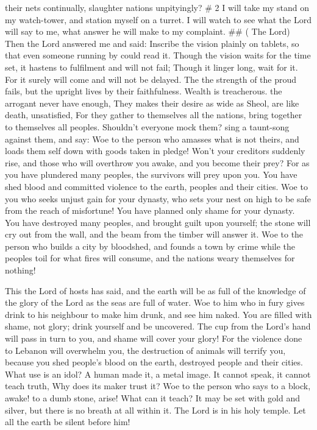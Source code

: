 their nets continually, slaughter nations unpityingly? \# 2 
I will take my stand on my watch-tower, and station myself on a turret.
I will watch to see what the Lord will say to me, what answer he will
make to my complaint. \#\# ( The Lord)  Then the Lord
answered me and said: Inscribe the vision plainly on tablets, so that
even someone running by could read it.  Though the vision
waits for the time set, it hastens to fulfilment and will not fail;
Though it linger long, wait for it. For it surely will come and will not
be delayed.  The the strength of the proud fails, but the
upright lives by their faithfulness.  Wealth is treacherous.
the arrogant never have enough, They makes their desire as wide as
Sheol, are like death, unsatisfied, For they gather to themselves all
the nations, bring together to themselves all peoples. 
Shouldn't everyone mock them? sing a taunt-song against them, and say:
Woe to the person who amasses what is not theirs, and loads them self
down with goods taken in pledge!  Won't your creditors
suddenly rise, and those who will overthrow you awake, and you become
their prey?  For as you have plundered many peoples, the
survivors will prey upon you. You have shed blood and committed violence
to the earth, peoples and their cities.  Woe to you who
seeks unjust gain for your dynasty, who sets your nest on high to be
safe from the reach of misfortune!  You have planned only
shame for your dynasty. You have destroyed many peoples, and brought
guilt upon yourself;  the stone will cry out from the wall,
and the beam from the timber will answer it.  Woe to the
person who builds a city by bloodshed, and founds a town by crime
 while the peoples toil for what fires will consume, and
the nations weary themselves for nothing!

This the Lord of hosts has said,  and the earth will be as
full of the knowledge of the glory of the Lord as the seas are full of
water.  Woe to him who in fury gives drink to his neighbour
to make him drunk, and see him naked.  You are filled with
shame, not glory; drink yourself and be uncovered. The cup from the
Lord's hand will pass in turn to you, and shame will cover your glory!
 For the violence done to Lebanon will overwhelm you, the
destruction of animals will terrify you, because you shed people's blood
on the earth, destroyed people and their cities.  What use
is an idol? A human made it, a metal image. It cannot speak, it cannot
teach truth, Why does its maker trust it?  Woe to the
person who says to a block, awake! to a dumb stone, arise! What can it
teach? It may be set with gold and silver, but there is no breath at all
within it.  The Lord is in his holy temple. Let all the
earth be silent before him!

